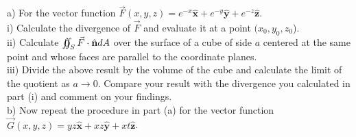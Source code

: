 \documentclass[11pt,letterpaper,boxed]{hmcpset}
\begin{document}
	\begin{problem}
a) For the vector function $\vec{F}(x,y,z) = e^{-x}\hat{\mathbf{x}} + e^{-y}\hat{\mathbf{y}} + e^{-z}\hat{\mathbf{z}}$.\\
i) Calculate the divergence of $\vec{F}$ and evaluate it at a point $(x_0, y_0, z_0$). \\
ii) Calculate $\varoiint_S \vec{F}\cdot \hat{\mathbf{n}} dA$ over the surface of a cube of side $a$ centered at the same point and whose  faces are parallel to the coordinate planes. \\
iii)  Divide the above result by the volume of the cube and calculate the limit of the quotient as
$a \rightarrow 0$. Compare your result with the divergence you calculated in part (i) and comment on your findings. \\
b) Now repeat the procedure in part (a) for the vector function $\vec{G}(x,y,z) = yz\hat{\mathbf{x}} + xz\hat{\mathbf{y}} + xt\hat{\mathbf{z}}$.
	\end{problem}
	
	\begin{solution}
		\vfill
	\end{solution}
	\newpage
	
	
\end{document}
